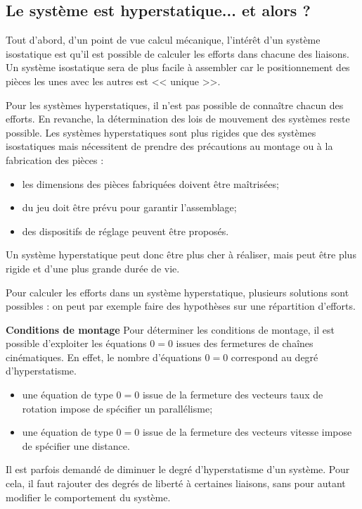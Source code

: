 \subsection{Le système est hyperstatique... et alors ?}

Tout d'abord, d'un point de vue calcul mécanique, l'intérêt d'un système isostatique est qu'il est possible de calculer les efforts dans chacune des liaisons. Un système isostatique sera de plus facile à assembler car le positionnement des pièces les unes avec les autres est << unique >>. 

Pour les systèmes hyperstatiques, il n'est pas possible de connaître chacun des efforts. En revanche, la détermination des lois de mouvement des systèmes reste possible. Les systèmes hyperstatiques sont plus rigides que des systèmes isostatiques mais nécessitent de prendre des précautions au montage ou à la fabrication des pièces : 
\begin{itemize}
 \item les dimensions des pièces fabriquées doivent être maîtrisées;
 \item du jeu doit être prévu pour garantir l'assemblage;
 \item des dispositifs de réglage peuvent être proposés.
\end{itemize}

Un système hyperstatique peut donc être plus cher à réaliser, mais peut être plus rigide et d'une plus grande durée de vie. 

Pour calculer les efforts dans un système hyperstatique, plusieurs solutions sont possibles : on peut par exemple faire des hypothèses sur une répartition d'efforts. 


\begin{methode}\small{\textbf{\textsf{Conditions de montage}}}
Pour déterminer les conditions de montage, il est possible d'exploiter les équations $0=0$ issues des fermetures de chaînes cinématiques.  En effet, le nombre d'équations $0=0$ correspond  au degré d'hyperstatisme.
\begin{itemize}
\item une équation de type $0=0$ issue de la fermeture des vecteurs taux de rotation impose de spécifier un parallélisme;
\item une équation de type $0=0$ issue de la fermeture des vecteurs vitesse impose de spécifier une distance.
\end{itemize}
\end{methode}

Il est parfois demandé de diminuer le degré d'hyperstatisme d'un système. Pour cela, il faut rajouter des degrés de liberté à certaines liaisons, sans pour autant modifier le comportement du système.


